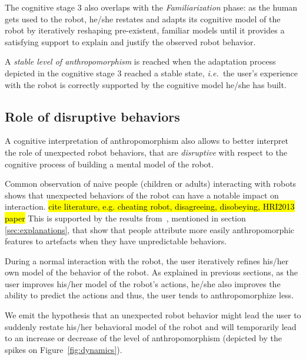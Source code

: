 \documentclass{frontiersSCNS} %
\newcommand{\ie}{{\textit{i.e.~}}}
\begin{document}
The cognitive stage 3 also overlaps with the \emph{Familiarization} phase: as
the human gets used to the robot, he/she restates and adapts its
cognitive model of the robot by iteratively reshaping pre-existent, familiar
models until it provides a satisfying support to explain and justify the
observed robot behavior.

A \emph{stable level of anthropomorphism} is reached when the adaptation process
depicted in the cognitive stage 3 reached a stable state, \ie the user's
experience with the robot is correctly supported by the cognitive model he/she
has built.


\subsection{Role of disruptive behaviors}
\label{sec:disruptive}

A cognitive interpretation of anthropomorphism also allows to better interpret
the role of unexpected robot behaviors, that are \emph{disruptive} with respect
to the cognitive process of building a mental model of the robot.

Common observation of naive people (children or adults) interacting with robots
shows that unexpected behaviors of the robot can have a notable impact on
interaction. \hl{cite literature, e.g. cheating robot, disagreeing, disobeying,
HRI2013 paper}
This is supported by the results from~\citet{Waytz2010}, mentioned in section
\ref{sec:explanations}, that show that people attribute more easily
anthropomorphic features to artefacts when they have unpredictable behaviors.

During a normal interaction with the robot, the user iteratively refines his/her
own model of the behavior of the robot. As explained in previous sections, as
the user improves his/her model of the robot's actions, he/she also improves the
ability to predict the actions and thus, the user tends to anthropomorphize
less.

We emit the hypothesis that an unexpected robot behavior might lead the user to
suddenly restate his/her behavioral model of the robot and will temporarily lead
to an increase or decrease of the level of anthropomorphism (depicted by the
spikes on Figure~\ref{fig:dynamics}).
\end{document}
